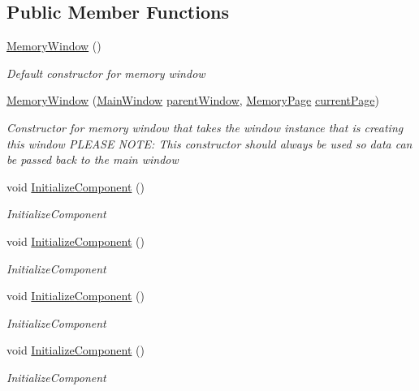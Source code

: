 \subsection*{Public Member Functions}
\begin{DoxyCompactItemize}
\item 
\hyperlink{class_c_p_u___o_s___simulator_1_1_memory_window_a9c72b7aa51f734437bd5e4aa26a230a2}{Memory\+Window} ()
\begin{DoxyCompactList}\small\item\em Default constructor for memory window \end{DoxyCompactList}\item 
\hyperlink{class_c_p_u___o_s___simulator_1_1_memory_window_a7b4208dc517300279d4cf3cd8cac6243}{Memory\+Window} (\hyperlink{class_c_p_u___o_s___simulator_1_1_main_window}{Main\+Window} \hyperlink{class_c_p_u___o_s___simulator_1_1_memory_window_afecdd32e0a0b0215d51f0630367dee3d}{parent\+Window}, \hyperlink{class_c_p_u___o_s___simulator_1_1_memory_1_1_memory_page}{Memory\+Page} \hyperlink{class_c_p_u___o_s___simulator_1_1_memory_window_ae1b974c8b976e19dde1a5491e3fe0e37}{current\+Page})
\begin{DoxyCompactList}\small\item\em Constructor for memory window that takes the window instance that is creating this window P\+L\+E\+A\+S\+E N\+O\+T\+E\+: This constructor should always be used so data can be passed back to the main window \end{DoxyCompactList}\item 
void \hyperlink{class_c_p_u___o_s___simulator_1_1_memory_window_a40473c2b8ba30a837cf2a122e0978dec}{Initialize\+Component} ()
\begin{DoxyCompactList}\small\item\em Initialize\+Component \end{DoxyCompactList}\item 
void \hyperlink{class_c_p_u___o_s___simulator_1_1_memory_window_a40473c2b8ba30a837cf2a122e0978dec}{Initialize\+Component} ()
\begin{DoxyCompactList}\small\item\em Initialize\+Component \end{DoxyCompactList}\item 
void \hyperlink{class_c_p_u___o_s___simulator_1_1_memory_window_a40473c2b8ba30a837cf2a122e0978dec}{Initialize\+Component} ()
\begin{DoxyCompactList}\small\item\em Initialize\+Component \end{DoxyCompactList}\item 
void \hyperlink{class_c_p_u___o_s___simulator_1_1_memory_window_a40473c2b8ba30a837cf2a122e0978dec}{Initialize\+Component} ()
\begin{DoxyCompactList}\small\item\em Initialize\+Component \end{DoxyCompactList}\end{DoxyCompactItemize}
